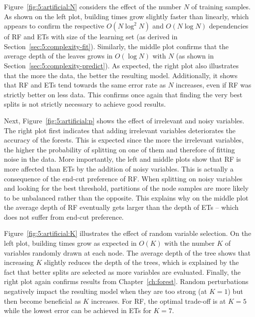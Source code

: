 Figure~\ref{fig:5:artificial:N} considers the effect of the number $N$ of
training samples. As shown on the left plot, building times grow slightly
faster than linearly, which appears to confirm the respective $O(N\log^2 N)$
and $O(N\log N)$ dependencies of RF and ETs with size of the learning set (as
derived in Section~\ref{sec:5:complexity-fit}). Similarly,  the middle plot
confirms that the average depth of the leaves grows in $O(\log N)$ with $N$ (as
shown in Section~\ref{sec:5:complexity-predict}). As expected, the right plot
also illustrates that the more the data, the better the resulting model.
Additionally, it shows that RF and ETs tend towards the same error rate as
$N$ increases, even if RF was strictly better on less data. This
confirms once again that finding the very best splits is not strictly necessary
to achieve good results.

Next, Figure~\ref{fig:5:artificial:p} shows the effect of irrelevant and noisy
variables. The right plot first indicates that adding irrelevant variables
deteriorates the accuracy of the forests. This is expected since the more the
irrelevant variables, the higher the probability of splitting on one of them
and therefore of fitting noise in the data. More importantly, the left and
middle plots show that RF is more affected than ETs by the addition of noisy
variables. This is actually a consequence of the end-cut preference of RF. When
splitting on noisy variables and looking for the best threshold, partitions of
the node samples are more likely to be unbalanced rather than the opposite.
This explains why on the middle plot the average depth of RF eventually gets
larger than the depth of ETs -- which does not suffer from end-cut preference.

Figure~\ref{fig:5:artificial:K} illustrates the effect of random variable
selection. On the left plot, building times grow as expected in $O(K)$ with the
number $K$ of variables randomly drawn at each node. The average depth of the
tree shows that increasing $K$ slightly reduces the depth of the trees, which
is  explained by the fact that better splits are selected as more variables are
evaluated. Finally, the right plot again confirms results from
Chapter~\ref{ch:forest}. Random perturbations negatively impact the resulting
model when they are too strong (at $K=1$) but then become beneficial as $K$
increases. For RF, the optimal trade-off is at $K=5$ while the lowest error can
be achieved in ETs for $K=7$.

